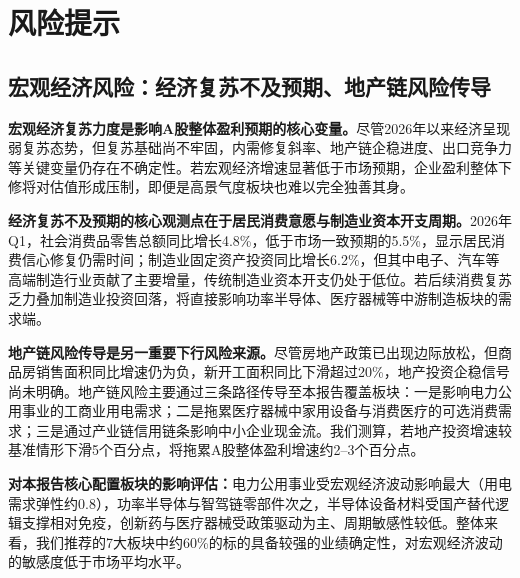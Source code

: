 
\chapter{风险提示}

\section{宏观经济风险：经济复苏不及预期、地产链风险传导}

\textbf{宏观经济复苏力度是影响A股整体盈利预期的核心变量。}尽管2026年以来经济呈现弱复苏态势，但复苏基础尚不牢固，内需修复斜率、地产链企稳进度、出口竞争力等关键变量仍存在不确定性。若宏观经济增速显著低于市场预期，企业盈利整体下修将对估值形成压制，即便是高景气度板块也难以完全独善其身。

\textbf{经济复苏不及预期的核心观测点在于居民消费意愿与制造业资本开支周期。}2026年Q1，社会消费品零售总额同比增长4.8\%，低于市场一致预期的5.5\%，显示居民消费信心修复仍需时间；制造业固定资产投资同比增长6.2\%，但其中电子、汽车等高端制造行业贡献了主要增量，传统制造业资本开支仍处于低位。若后续消费复苏乏力叠加制造业投资回落，将直接影响功率半导体、医疗器械等中游制造板块的需求端。

\textbf{地产链风险传导是另一重要下行风险来源。}尽管房地产政策已出现边际放松，但商品房销售面积同比增速仍为负，新开工面积同比下滑超过20\%，地产投资企稳信号尚未明确。地产链风险主要通过三条路径传导至本报告覆盖板块：一是影响电力公用事业的工商业用电需求；二是拖累医疗器械中家用设备与消费医疗的可选消费需求；三是通过产业链信用链条影响中小企业现金流。我们测算，若地产投资增速较基准情形下滑5个百分点，将拖累A股整体盈利增速约2--3个百分点。

\textbf{对本报告核心配置板块的影响评估：}电力公用事业受宏观经济波动影响最大（用电需求弹性约0.8），功率半导体与智驾链零部件次之，半导体设备材料受国产替代逻辑支撑相对免疫，创新药与医疗器械受政策驱动为主、周期敏感性较低。整体来看，我们推荐的7大板块中约60\%的标的具备较强的业绩确定性，对宏观经济波动的敏感度低于市场平均水平。

